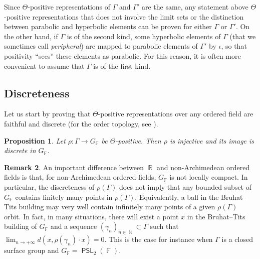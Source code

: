 \documentclass{amsart}
\theoremstyle{plain}
\newtheorem{proposition}{Proposition}[section]
\theoremstyle{definition}
\newtheorem{remark}[proposition]{Remark}
\DeclareMathOperator{\PSL}{\mathsf{PSL}}
\DeclareMathOperator{\Fb}{{\mathbb{F}}}
\DeclareMathOperator{\Nb}{{\mathbb{N}}}
\DeclareMathOperator{\Rb}{{\mathbb{R}}}
\newcommand{\1}{\mathbf{1}}
\begin{document}
Since $\Theta$-positive representations of $\Gamma$ and $\Gamma'$ are the same, any statement above $\Theta$-positive representations that does not involve the limit sets or the distinction between parabolic and hyperbolic elements can be proven for either $\Gamma$ or $\Gamma'$. On the other hand, if $\Gamma$ is of the second kind, some hyperbolic elements of $\Gamma$ (that we sometimes call \emph{peripheral}) are mapped to parabolic elements of $\Gamma'$ by $\iota$, so that positivity ``sees'' these elements as parabolic. For this reason, it is often more convenient to assume that $\Gamma$ is of the first kind.

\subsection{Discreteness}

Let us start by proving that $\Theta$-positive representations over any ordered field are faithful and discrete (for the order topology, see ).

\begin{proposition}
\label{propo: positive implies injective and discrete}
    Let $\rho \colon \Gamma \to G_{\Fb}$ be $\Theta$-positive.
    Then $\rho$ is injective and its image is discrete in $G_{\Fb}$. 
\end{proposition}

\begin{remark}
An important difference between $\Rb$ and non-Archimedean ordered fields is that, for non-Archimedean ordered fields, $G_{\Fb}$ is not locally compact. In particular, the discreteness of $\rho(\Gamma)$ does not imply that any bounded subset of $G_{\Fb}$ contains finitely many points in $\rho(\Gamma)$. Equivalently, a ball in the Bruhat--Tits building may very well contain infinitely many points of a given $\rho(\Gamma)$ orbit. In fact, in many situations, there will exist a point $x$ in the Bruhat--Tits building of $G_{\Fb}$ and a sequence $(\gamma_n)_{n\in \Nb} \subset \Gamma$ such that $\lim_{n\to +\infty}d(x,\rho(\gamma_n)\cdot x) = 0$. This is the case for instance when $\Gamma$ is a closed surface group and $G_{\Fb} = \PSL_2(\Fb)$.
\end{remark}
\end{document}
